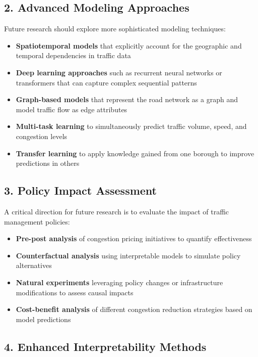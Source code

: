 \documentclass[
  letterpaper,
  DIV=11,
  numbers=noendperiod]{scrreprt}
\providecommand{\tightlist}{%
  \setlength{\itemsep}{0pt}\setlength{\parskip}{0pt}}\usepackage{longtable,booktabs,array}
\begin{document}
\subsection{2. Advanced Modeling
Approaches}\label{advanced-modeling-approaches}

Future research should explore more sophisticated modeling techniques:

\begin{itemize}
\tightlist
\item
  \textbf{Spatiotemporal models} that explicitly account for the
  geographic and temporal dependencies in traffic data
\item
  \textbf{Deep learning approaches} such as recurrent neural networks or
  transformers that can capture complex sequential patterns
\item
  \textbf{Graph-based models} that represent the road network as a graph
  and model traffic flow as edge attributes
\item
  \textbf{Multi-task learning} to simultaneously predict traffic volume,
  speed, and congestion levels
\item
  \textbf{Transfer learning} to apply knowledge gained from one borough
  to improve predictions in others
\end{itemize}

\subsection{3. Policy Impact Assessment}\label{policy-impact-assessment}

A critical direction for future research is to evaluate the impact of
traffic management policies:

\begin{itemize}
\tightlist
\item
  \textbf{Pre-post analysis} of congestion pricing initiatives to
  quantify effectiveness
\item
  \textbf{Counterfactual analysis} using interpretable models to
  simulate policy alternatives
\item
  \textbf{Natural experiments} leveraging policy changes or
  infrastructure modifications to assess causal impacts
\item
  \textbf{Cost-benefit analysis} of different congestion reduction
  strategies based on model predictions
\end{itemize}

\subsection{4. Enhanced Interpretability
Methods}\label{enhanced-interpretability-methods}
\end{document}
